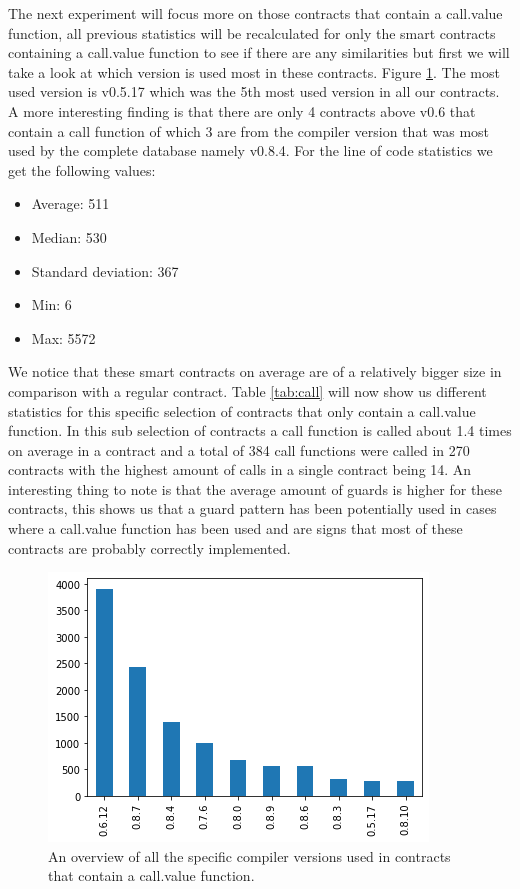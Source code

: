 \documentclass[10pt,conference]{IEEEtran}
\begin{document}
The next experiment will focus more on those contracts that contain a call.value function, all previous statistics will be recalculated for only the smart contracts containing a call.value function to see if there are any similarities but first we will take a look at which version is used most in these contracts.
Figure \ref{fig:call_version}. The most used version is v0.5.17 which was the 5th most used version in all our contracts. A more interesting finding is that there are only 4 contracts above v0.6 that contain a call function of which 3 are from the compiler version that was most used by the complete database namely v0.8.4. For the line of code statistics we get the following values:
\begin{itemize}
    \item Average: 511
    \item Median: 530
    \item Standard deviation: 367
    \item Min: 6
    \item Max: 5572
\end{itemize}
We notice that these smart contracts on average are of a relatively bigger size in comparison with a regular contract.
Table \ref{tab:call} will now show us different statistics for this specific selection of contracts that only contain a call.value function. In this sub selection of contracts a call function is called about 1.4 times on average in a contract and a total of 384 call functions were called in 270 contracts with the highest amount of calls in a single contract being 14. An interesting thing to note is that the average amount of guards is higher for these contracts, this shows us that a guard pattern has been potentially used in cases where a call.value function has been used and are signs that most of these contracts are probably correctly implemented. 

\begin{figure}[h]
  \centering
  \includegraphics[width=\linewidth]{img/call_clean_v2.png}
  \caption{An overview of all the specific compiler versions used in contracts that contain a call.value function. }
  \label{fig:call_version}
\end{figure}
\end{document}
